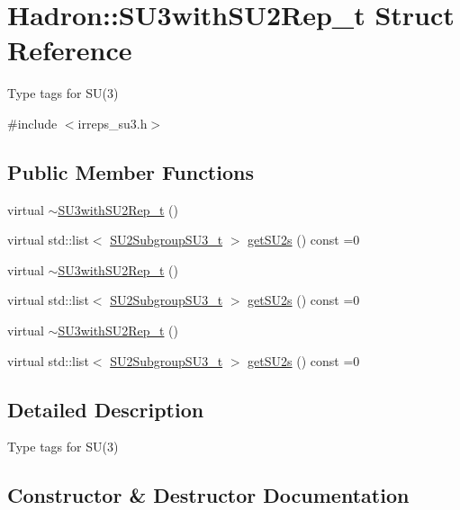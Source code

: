 \hypertarget{structHadron_1_1SU3withSU2Rep__t}{}\section{Hadron\+:\+:S\+U3with\+S\+U2\+Rep\+\_\+t Struct Reference}
\label{structHadron_1_1SU3withSU2Rep__t}


Type tags for S\+U(3)  




{\ttfamily \#include $<$irreps\+\_\+su3.\+h$>$}

\subsection*{Public Member Functions}
\begin{DoxyCompactItemize}
\item 
virtual \mbox{\hyperlink{structHadron_1_1SU3withSU2Rep__t_a17a2aadc694cdd6b0c65b63704b89d4b}{$\sim$\+S\+U3with\+S\+U2\+Rep\+\_\+t}} ()
\item 
virtual std\+::list$<$ \mbox{\hyperlink{structHadron_1_1SU2SubgroupSU3__t}{S\+U2\+Subgroup\+S\+U3\+\_\+t}} $>$ \mbox{\hyperlink{structHadron_1_1SU3withSU2Rep__t_a6bebd41fd203e3340441c04ccc220899}{get\+S\+U2s}} () const =0
\item 
virtual \mbox{\hyperlink{structHadron_1_1SU3withSU2Rep__t_a17a2aadc694cdd6b0c65b63704b89d4b}{$\sim$\+S\+U3with\+S\+U2\+Rep\+\_\+t}} ()
\item 
virtual std\+::list$<$ \mbox{\hyperlink{structHadron_1_1SU2SubgroupSU3__t}{S\+U2\+Subgroup\+S\+U3\+\_\+t}} $>$ \mbox{\hyperlink{structHadron_1_1SU3withSU2Rep__t_a6bebd41fd203e3340441c04ccc220899}{get\+S\+U2s}} () const =0
\item 
virtual \mbox{\hyperlink{structHadron_1_1SU3withSU2Rep__t_a17a2aadc694cdd6b0c65b63704b89d4b}{$\sim$\+S\+U3with\+S\+U2\+Rep\+\_\+t}} ()
\item 
virtual std\+::list$<$ \mbox{\hyperlink{structHadron_1_1SU2SubgroupSU3__t}{S\+U2\+Subgroup\+S\+U3\+\_\+t}} $>$ \mbox{\hyperlink{structHadron_1_1SU3withSU2Rep__t_a6bebd41fd203e3340441c04ccc220899}{get\+S\+U2s}} () const =0
\end{DoxyCompactItemize}


\subsection{Detailed Description}
Type tags for S\+U(3) 

\subsection{Constructor \& Destructor Documentation}
\mbox{\label{structHadron_1_1SU3withSU2Rep__t_a17a2aadc694cdd6b0c65b63704b89d4b}} 
